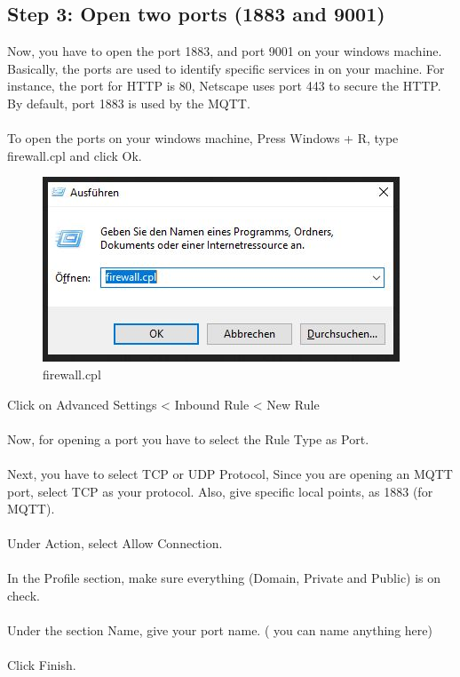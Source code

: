 \documentclass[oneside]{book}
\begin{document}
\subsection*{Step 3: Open two ports (1883 and 9001)}
Now, you have to open the port 1883, and port 9001 on your windows machine. Basically, the ports are used to identify specific services in on your machine. For instance, the port for HTTP is 80, Netscape uses port 443 to secure the HTTP. By default, port 1883 is used by the MQTT. 
\\\\
To open the ports on your windows machine, Press Windows + R, type firewall.cpl and click Ok.
\begin{figure}[H]
\centering
\includegraphics[scale=.6]{images/ws.jpg}
\caption{firewall.cpl}
\end{figure}
Click on Advanced Settings < Inbound Rule < New Rule
\\\\
Now, for opening a port you have to select the Rule Type as Port.
\\\\
Next, you have to select TCP or UDP Protocol, Since you are opening an MQTT port, select TCP as your protocol. Also, give specific local points, as 1883 (for MQTT).
\\\\
Under Action, select Allow Connection.
\\\\
In the Profile section, make sure everything (Domain, Private and Public) is on check.
\\\\
Under the section Name, give your port name. ( you can name anything here)
\\\\
Click Finish.
\end{document}
